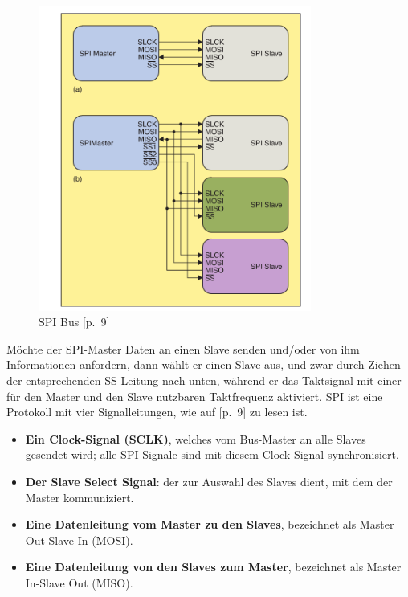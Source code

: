 \begin{figure}[h]
	\begin{center}
		\includegraphics[width=0.8\textwidth]{./images/spi-bus.jpg}
	\end{center}
	\vspace{-5pt}
	\caption[SPI Bus]{SPI Bus \cite{Leens2009}[p.~9]} %
	\label{fig:spi:bus}
	\vspace{-5pt}
\end{figure}
Möchte der SPI-Master Daten an einen Slave senden und/oder von ihm Informationen anfordern, dann wählt er einen Slave aus, und zwar durch Ziehen der entsprechenden SS-Leitung nach unten, während er das Taktsignal mit einer für den Master und den Slave nutzbaren Taktfrequenz aktiviert.
SPI ist eine Protokoll mit vier Signalleitungen, wie auf \cite{Leens2009}[p.~9] zu lesen ist.
\begin{itemize}
	\item \textbf{Ein Clock-Signal (SCLK)}, welches vom Bus-Master an alle Slaves gesendet wird; alle SPI-Signale sind mit diesem Clock-Signal synchronisiert.
	\item \textbf{Der Slave Select Signal}: der zur Auswahl des Slaves dient, mit dem der Master kommuniziert.
	\item \textbf{Eine Datenleitung vom Master zu den Slaves}, bezeichnet als Master Out-Slave In (MOSI).
	\item \textbf{Eine Datenleitung von den Slaves zum Master}, bezeichnet als Master In-Slave Out (MISO).
\end{itemize}
